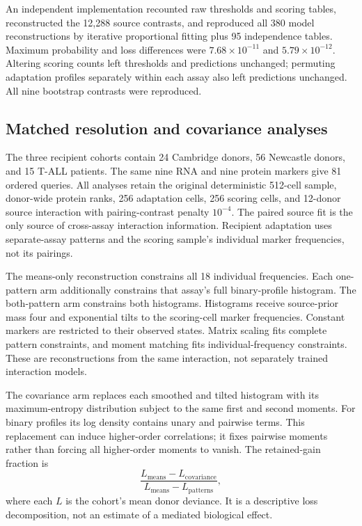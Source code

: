 An independent implementation recounted raw thresholds and scoring tables,
reconstructed the 12,288 source contrasts, and reproduced all 380 model
reconstructions by iterative proportional fitting plus 95 independence tables.
Maximum probability and loss differences were $7.68\times10^{-11}$ and
$5.79\times10^{-12}$. Altering scoring counts left thresholds and predictions
unchanged; permuting adaptation profiles separately within each assay also
left predictions unchanged. All nine bootstrap contrasts were reproduced.

\subsection{Matched resolution and covariance analyses}

The three recipient cohorts contain 24 Cambridge donors, 56 Newcastle donors,
and 15 T-ALL patients. The same nine RNA and nine protein markers give 81
ordered queries. All analyses retain the original deterministic 512-cell
sample, donor-wide protein ranks, 256 adaptation cells, 256 scoring cells,
and 12-donor source interaction with pairing-contrast penalty $10^{-4}$.
The paired source fit is the only source of cross-assay interaction
information. Recipient adaptation uses separate-assay patterns and the
scoring sample's individual marker frequencies, not its pairings.

The means-only reconstruction constrains all 18 individual frequencies.
Each one-pattern arm additionally constrains that assay's full binary-profile
histogram. The both-pattern arm constrains both histograms. Histograms receive
source-prior mass four and exponential tilts to the scoring-cell
marker frequencies. Constant markers are restricted to their observed states.
Matrix scaling fits complete pattern constraints, and moment matching fits
individual-frequency constraints. These are reconstructions from the same
interaction, not separately trained interaction models.

The covariance arm replaces each smoothed and tilted histogram with its
maximum-entropy distribution subject to the same first and second moments.
For binary profiles its log density contains unary and pairwise terms.
This replacement can induce higher-order correlations; it fixes pairwise
moments rather than forcing all higher-order moments to vanish.
The retained-gain fraction is
\[
 \frac{L_{\mathrm{means}}-L_{\mathrm{covariance}}}
 {L_{\mathrm{means}}-L_{\mathrm{patterns}}},
\]
where each $L$ is the cohort's mean donor deviance. It is a descriptive loss
decomposition, not an estimate of a mediated biological effect.

